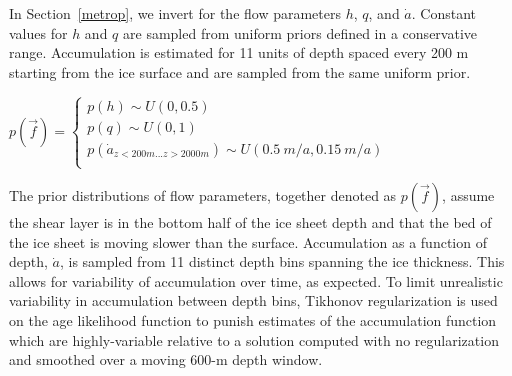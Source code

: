 In Section~\ref{metrop}, we invert for the flow parameters $h$, $q$, and $\dot{a}$. Constant values for $h$ and $q$ are sampled from uniform priors defined in a conservative range. Accumulation is estimated for 11 units of depth spaced every 200 m starting from the ice surface and are sampled from the same uniform prior.

\begin{center}
$p(\vec{f}) = 
	\begin{cases}
		p(h) \sim U(0, 0.5) \\
		p(q) \sim U (0, 1) \\
		p(\dot{a}_{z < 200 m ... z > 2000 m}) \sim U(0.5~m/a,0.15~m/a)\\
	\end{cases}
$	
\end{center}

The prior distributions of flow parameters, together denoted as $p(\vec{f})$, assume the shear layer is in the bottom half of the ice sheet depth and that the bed of the ice sheet is moving slower than the surface. Accumulation as a function of depth, $\dot{a}$, is sampled from 11 distinct depth bins spanning the ice thickness. This allows for variability of accumulation over time, as expected. To limit unrealistic variability in accumulation between depth bins, Tikhonov regularization is used on the age likelihood function to punish estimates of the accumulation function which are highly-variable relative to a solution computed with no regularization and smoothed over a moving 600-m depth window.
